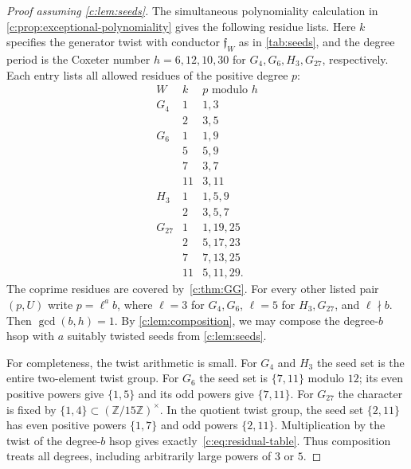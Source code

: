 \documentclass[11pt]{amsart}
\theoremstyle{definition}
\newcommand{\Z}{\mathbb Z}\newcommand{\N}{\mathbb Z_{\ge0}}
\begin{document}
\begin{proof}[Proof assuming \cref{c:lem:seeds}]
The simultaneous polynomiality calculation in \cref{c:prop:exceptional-polynomiality}
gives the following residue lists. Here $k$
specifies the generator twist with conductor $\mathfrak f_W$ as in
\cref{tab:seeds}, and the degree period is the Coxeter number
$h=6,12,10,30$ for $G_4,G_6,H_3,G_{27}$, respectively.
Each entry lists all allowed residues of the positive degree $p$:
\begin{equation}\label{c:eq:residual-table}
\begin{array}{c|c|l}
 W&k& p\text{ modulo }h\\\hline
 G_4&1&1,3\\
    &2&3,5\\\hline
 G_6&1&1,9\\
    &5&5,9\\
    &7&3,7\\
    &11&3,11\\\hline
 H_3&1&1,5,9\\
    &2&3,5,7\\\hline
 G_{27}&1&1,19,25\\
       &2&5,17,23\\
       &7&7,13,25\\
       &11&5,11,29.
\end{array}
\end{equation}
The coprime residues are covered by~\cref{c:thm:GG}. For every other
listed pair $(p,U)$ write $p=\ell^a b$, where $\ell=3$ for $G_4,G_6$,
$\ell=5$ for $H_3,G_{27}$, and $\ell\nmid b$. Then $\gcd(b,h)=1$.
By \cref{c:lem:composition}, we may compose the degree-$b$ hsop
with $a$ suitably twisted seeds from \cref{c:lem:seeds}.

For completeness, the twist arithmetic is small. For $G_4$ and $H_3$
the seed set is the entire two-element twist group. For $G_6$ the seed
set is $\{7,11\}$ modulo $12$; its even positive powers give $\{1,5\}$
and its odd powers give $\{7,11\}$. For $G_{27}$ the character is fixed
by $\{1,4\}\subset(\Z/15\Z)^\times$. In the quotient twist group,
the seed set $\{2,11\}$ has even positive powers $\{1,7\}$ and odd
powers $\{2,11\}$. Multiplication by the twist of the degree-$b$ hsop
gives exactly~\cref{c:eq:residual-table}.
Thus composition treats all degrees, including arbitrarily large powers
of $3$ or $5$.
\end{proof}
\end{document}
